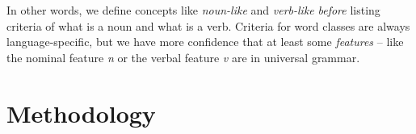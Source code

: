 \documentclass[../main.tex]{subfiles}
\begin{document}
In other words, we define concepts like \emph{noun-like} and \emph{verb-like} \emph{before} listing criteria of 
what is a noun and what is a verb. Criteria for word classes are always language-specific, but we have more 
confidence that at least some \emph{features} -- like the nominal feature \textit{n} or the verbal feature 
\textit{v} are in universal grammar. 

\section{Methodology}

\end{document}
